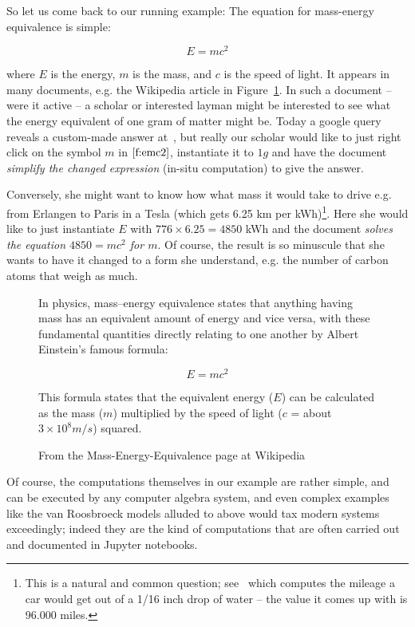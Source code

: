 So let us come back to our running example: The equation for mass-energy equivalence is
simple:

\begin{equation}\label{f:emc2}
  E=mc^2
\end{equation}

where $E$ is the energy, $m$ is the mass, and $c$ is the speed of light. It appears in
many documents, e.g. the Wikipedia article in Figure~\ref{fig:emc2-wikipedia}. In such a
document -- were it active -- a scholar or interested layman might be interested to see
what the energy equivalent of one gram of matter might be. Today a google query reveals a
custom-made answer at~\cite{Odenwald:q388}, but really our scholar would like to just right
click on the symbol $m$ in $\ref{f:emc2}$, instantiate it to $1g$ and have the document
\emph{simplify the changed expression} (in-situ computation) to give the answer.

Conversely, she might want to know how what mass it would take to drive e.g. from Erlangen
to Paris in a Tesla (which gets 6.25 km per kWh)\footnote{This is a natural and common
  question; see~\cite{RT:emc2} which computes the mileage a car would get out of a 1/16
  inch drop of water -- the value it comes up with is 96.000 miles.}. Here she would like
to just instantiate $E$ with $776 \times 6.25=4850$ kWh and the document \emph{solves the
  equation $4850=mc^2$ for $m$}. Of course, the result is so minuscule that she wants to have it changed to a
form she understand, e.g. the number of carbon atoms that weigh as much.

\begin{figure}\centering
  \begin{boxedquote}
    In physics, mass–energy equivalence states that anything having mass has an equivalent
    amount of energy and vice versa, with these fundamental quantities directly relating
    to one another by Albert Einstein's famous formula:

    \[E=mc^2\] 

    This formula states that the equivalent energy ($E$) can be calculated as the mass ($m$)
    multiplied by the speed of light ($c$ = about $3\times10^8 m/s$) squared.
  \end{boxedquote}
  \caption{From the Mass-Energy-Equivalence page at Wikipedia~\cite{WP:emc2}}
  \label{fig:emc2-wikipedia}
\end{figure}

Of course, the computations themselves in our example are rather simple, and can be
executed by any computer algebra system, and even complex examples like the van Roosbroeck
models alluded to above would tax modern systems exceedingly; indeed they are the kind
of computations that are often carried out and documented in Jupyter notebooks.

